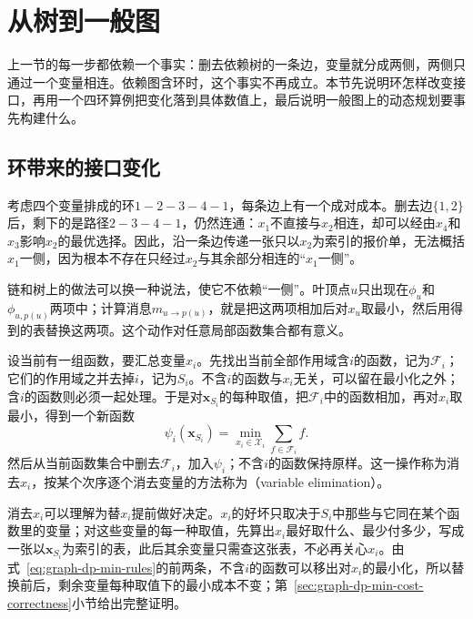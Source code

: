 
\section{从树到一般图}
\label{sec:graph-dp-tree-to-general}

上一节的每一步都依赖一个事实：删去依赖树的一条边，变量就分成两侧，两侧只通过一个变量相连。依赖图含环时，这个事实不再成立。本节先说明环怎样改变接口，再用一个四环算例把变化落到具体数值上，最后说明一般图上的动态规划要事先构建什么。

\subsection{环带来的接口变化}
\label{sec:graph-dp-cycle-interface}

考虑四个变量排成的环$1-2-3-4-1$，每条边上有一个成对成本。删去边$\{1,2\}$后，剩下的是路径$2-3-4-1$，仍然连通：$x_1$不直接与$x_2$相连，却可以经由$x_4$和$x_3$影响$x_2$的最优选择。因此，沿一条边传递一张只以$x_2$为索引的报价单，无法概括$x_1$一侧，因为根本不存在只经过$x_2$与其余部分相连的“$x_1$一侧”。

链和树上的做法可以换一种说法，使它不依赖“一侧”。叶顶点$u$只出现在$\phi_u$和$\phi_{u,p(u)}$两项中；计算消息$m_{u\to p(u)}$，就是把这两项相加后对$x_u$取最小，然后用得到的表替换这两项。这个动作对任意局部函数集合都有意义。

设当前有一组函数，要汇总变量$x_i$。先找出当前全部作用域含$i$的函数，记为$\mathcal F_i$；它们的作用域之并去掉$i$，记为$S_i$。不含$i$的函数与$x_i$无关，可以留在最小化之外；含$i$的函数则必须一起处理。于是对$\bm x_{S_i}$的每种取值，把$\mathcal F_i$中的函数相加，再对$x_i$取最小，得到一个新函数
\begin{equation}
\psi_i(\bm x_{S_i})=\min_{x_i\in\mathcal X_i}\sum_{f\in\mathcal F_i}f .
\label{eq:graph-dp-elimination-step}
\end{equation}
然后从当前函数集合中删去$\mathcal F_i$，加入$\psi_i$；不含$i$的函数保持原样。这一操作称为消去$x_i$，按某个次序逐个消去变量的方法称为（variable elimination）。

消去$x_i$可以理解为替$x_i$提前做好决定。$x_i$的好坏只取决于$S_i$中那些与它同在某个函数里的变量；对这些变量的每一种取值，先算出$x_i$最好取什么、最少付多少，写成一张以$\bm x_{S_i}$为索引的表，此后其余变量只需查这张表，不必再关心$x_i$。由式~\eqref{eq:graph-dp-min-rules}的前两条，不含$i$的函数可以移出对$x_i$的最小化，所以替换前后，剩余变量每种取值下的最小成本不变；第~\ref{sec:graph-dp-min-cost-correctness}小节给出完整证明。

